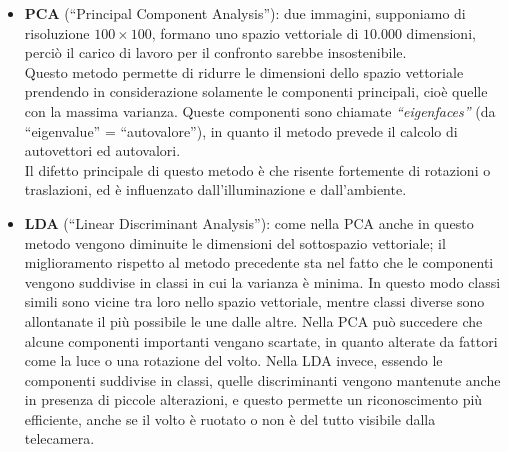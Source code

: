 \begin{itemize}
\item \textbf{PCA} (“Principal Component Analysis”): due immagini, supponiamo di risoluzione $100\times100$, formano uno spazio vettoriale di $10.000$ dimensioni, perciò il carico di lavoro per il confronto sarebbe insostenibile.\\
Questo metodo permette di ridurre le dimensioni dello spazio vettoriale prendendo in considerazione solamente le componenti principali, cioè quelle con la massima varianza.
Queste componenti sono chiamate \textit{“eigenfaces”} (da “eigenvalue” = “autovalore”), in quanto il metodo prevede il calcolo di autovettori ed autovalori.\\
Il difetto principale di questo metodo è che risente fortemente di rotazioni o traslazioni, ed è influenzato dall'illuminazione e dall'ambiente.

\item \textbf{LDA} (“Linear Discriminant Analysis”): come nella PCA anche in questo metodo vengono diminuite le dimensioni del sottospazio vettoriale; il miglioramento rispetto al metodo precedente sta nel fatto che le componenti vengono suddivise in classi in cui la varianza è minima. In questo modo classi simili sono vicine tra loro nello spazio vettoriale, mentre classi diverse sono allontanate il più possibile le une dalle altre. Nella PCA può succedere che alcune componenti importanti vengano scartate, in quanto alterate da fattori come la luce o una rotazione del volto. Nella LDA invece, essendo le componenti suddivise in classi, quelle discriminanti vengono mantenute anche in presenza di piccole alterazioni, e questo permette un riconoscimento più efficiente, anche se il volto è ruotato o non è del tutto visibile dalla telecamera.


\end{itemize}
